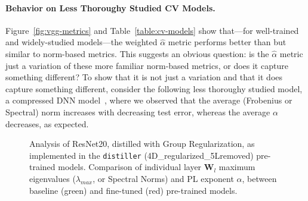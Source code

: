 \paragraph{Behavior on Less Thoroughy Studied CV Models.}

Figure~\ref{fig:vgg-metrics} and Table~\ref{table:cv-models} show that---for well-trained and widely-studied models---the weighted $\hat{\alpha}$ metric performs better than but similar to norm-based metrics.
This suggests an obvious question: is the $\hat{\alpha}$ metric just a variation of these more familiar norm-based metrics, or does it capture something different?  
To show that it is not just a variation and that it does capture something different, consider the following less thoroughy studied model, a compressed DNN model~\cite{CWZZ17_TR}, where we observed that the average (Frobenius or Spectral) norm increases with decreasing test error, whereas the average $\alpha$ decreases, as expected.  

\begin{figure}[t]
   \centering
   \qquad
   \caption{
     Analysis of ResNet20, distilled with Group Regularization, as implemented in the \texttt{distiller} (4D\_regularized\_5Lremoved) pre-trained models.  
     Comparison of individual layer $\mathbf{W}_{l}$ maximum eigenvalues ($\lambda_{max}$, or Spectral Norms) and  
     PL exponent $\alpha$, between baseline (green) and fine-tuned (red)  pre-trained models.   
           }
   \label{fig:resnet204D5L}
\end{figure}

